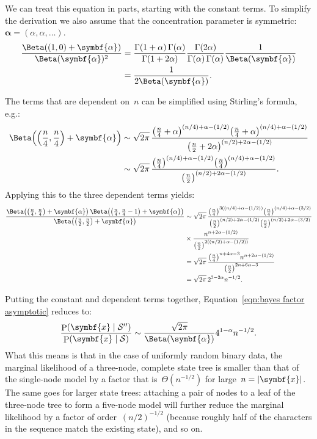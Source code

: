 \documentclass[12pt,a4paper]{article}
\newcommand\mc[1]{\mathcal{#1}}               %
\newcommand\ub[1]{\symbf{#1}}                 %
\DeclareMathOperator\Pb{P}                    %
\DeclarePairedDelimiter\lr{\lparen}{\rparen}  %
\DeclarePairedDelimiter\abs{\lvert}{\rvert}   %
\begin{document}
We can treat this equation in parts, starting with the constant terms. To
simplify the derivation we also assume that the concentration parameter is
symmetric:~\(\ub{\alpha} = (\alpha, \alpha, \dots)\).
\begin{align*}
  \frac{\Beta((1, 0) + \ub{\alpha})}{\Beta(\ub{\alpha})^2} &=
    \frac{\Gamma(1 + \alpha)\, \Gamma(\alpha)}{\Gamma(1 + 2\alpha)}
    \frac{\Gamma(2\alpha)}{\Gamma(\alpha)\, \Gamma(\alpha)}
    \frac{1}{\Beta(\ub{\alpha})} \\
  &= \frac{1}{2\Beta(\ub{\alpha})}.
\end{align*}

The terms that are dependent on~\(n\) can be simplified using Stirling's
formula, e.g.:
\begin{align*}
  \Beta\lr*{\lr*{\frac{n}{4}, \frac{n}{4}} + \ub{\alpha}} &\sim
    \sqrt{2\pi}\, \frac{\lr*{\frac{n}{4} + \alpha}^{(n/4)+\alpha-(1/2)}
    \lr*{\frac{n}{4} + \alpha}^{(n/4)+\alpha-(1/2)}}
    {\lr*{\frac{n}{2} + 2\alpha}^{(n/2)+2\alpha-(1/2)}} \\
  &\sim \sqrt{2\pi}\, \frac{\lr*{\frac{n}{4}}^{(n/4)+\alpha-(1/2)}
    \lr*{\frac{n}{4}}^{(n/4)+\alpha-(1/2)}}
    {\lr*{\frac{n}{2}}^{(n/2)+2\alpha-(1/2)}}.
\end{align*}
Applying this to the three dependent terms yields:
\begin{align*}
  \frac{\Beta\lr*{\lr*{\frac{n}{4}, \frac{n}{4}} + \ub{\alpha}}\,
    \Beta\lr*{\lr*{\frac{n}{4}, \frac{n}{4}-1} + \ub{\alpha}}}
    {\Beta\lr*{\lr*{\frac{n}{2}, \frac{n}{2}} + \ub{\alpha}}}
  &\sim \sqrt{2\pi}\, \frac{\lr*{\frac{n}{4}}^{3((n/4)+\alpha-(1/2))}
    \lr*{\frac{n}{4}}^{(n/4)+\alpha-(3/2)}}
    {\lr*{\frac{n}{2}}^{(n/2)+2\alpha-(1/2)}
    \lr*{\frac{n}{2}}^{(n/2)+2\alpha-(3/2)}} \\
  &\times \frac{n^{n+2\alpha-(1/2)}}
    {\lr*{\frac{n}{2}}^{2((n/2)+\alpha-(1/2))}} \\
  &= \sqrt{2\pi}\, \frac{\lr*{\frac{n}{4}}^{n+4\alpha-3} n^{n+2\alpha-(1/2)}}
    {\lr*{\frac{n}{2}}^{2n+6\alpha-3}} \\
  &= \sqrt{2\pi}\, 2^{3-2\alpha} n^{-1/2}.
\end{align*}

Putting the constant and dependent terms together, Equation~\eqref{eqn:bayes
factor asymptotic} reduces to:
\begin{equation}\label{eqn:bayes factor asymptotic 2}
  \frac{\Pb(\ub{x} \mid \mc{S}'')}{\Pb(\ub{x} \mid \mc{S})} \sim
    \frac{\sqrt{2\pi}}{\Beta(\ub{\alpha})} 4^{1-\alpha} n^{-1/2}.
\end{equation}
What this means is that in the case of uniformly random binary data, the
marginal likelihood of a three-node, complete state tree is smaller than that of
the single-node model by a factor that is~\(\Theta(n^{-1/2})\) for large~\(n =
\abs{\ub{x}}\). The same goes for larger state trees: attaching a pair of nodes
to a leaf of the three-node tree to form a five-node model will further reduce
the marginal likelihood by a factor of order~\((n/2)^{-1/2}\) (because roughly
half of the characters in the sequence match the existing state), and so on.
\end{document}
